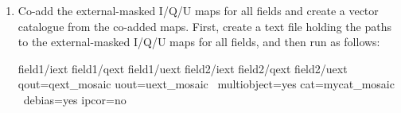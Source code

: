 \begin{enumerate}
\item Co-add the external-masked I/Q/U maps for all fields and create a vector catalogue from 
the co-added maps. First, create a text file holding the paths to the external-masked I/Q/U maps 
for all fields, and then run  as follows:

 \begin{terminalv}
        field1/iext
        field1/qext
        field1/uext
        field2/iext
        field2/qext
        field2/uext
                  qout=qext_mosaic uout=uext_mosaic \
                  multiobject=yes cat=mycat_mosaic \
                  debias=yes ipcor=no
\end{terminalv}

\end{enumerate}
